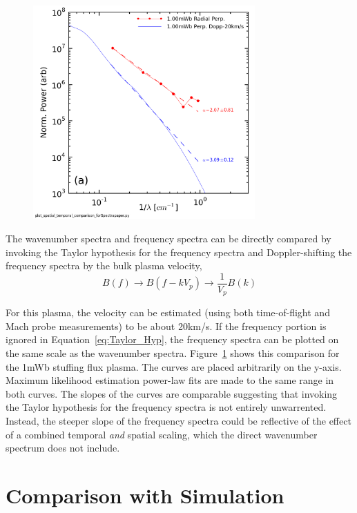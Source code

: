 \documentclass[aip,prl,amsmath,amssymb,reprint,superscriptaddress]{revtex4-1} %
\begin{document}
\begin{figure}[!htbp]
\centerline{
\includegraphics[width=8.5cm]{B_spatial_temporal_comp_wFits_40t60us}}
\caption{\label{fig:wavenumber_comp}}
\end{figure}

The wavenumber spectra and frequency spectra can be directly compared by invoking the Taylor hypothesis for the frequency spectra and Doppler-shifting the frequency spectra by the bulk plasma velocity,
\begin{equation}
B(f) \longrightarrow B(f-kV_{p}) \longrightarrow \frac{1}{V_{p}}B(k)
\label{eq:Taylor_Hyp}
\end{equation}

For this plasma, the velocity can be estimated (using both time-of-flight and Mach probe measurements) to be about 20km/s. If the frequency portion is ignored in Equation~\ref{eq:Taylor_Hyp}, the frequency spectra can be plotted on the same scale as the wavenumber spectra. Figure~\ref{fig:wavenumber_comp} shows this comparison for the 1mWb stuffing flux plasma. The curves are placed arbitrarily on the y-axis. Maximum likelihood estimation power-law fits are made to the same range in both curves. The slopes of the curves are comparable suggesting that invoking the Taylor hypothesis for the frequency spectra is not entirely unwarrented. Instead, the steeper slope of the frequency spectra could be reflective of the effect of a combined temporal {\it and} spatial scaling, which the direct wavenumber spectrum does not include.

\section{Comparison with Simulation}
\end{document}
